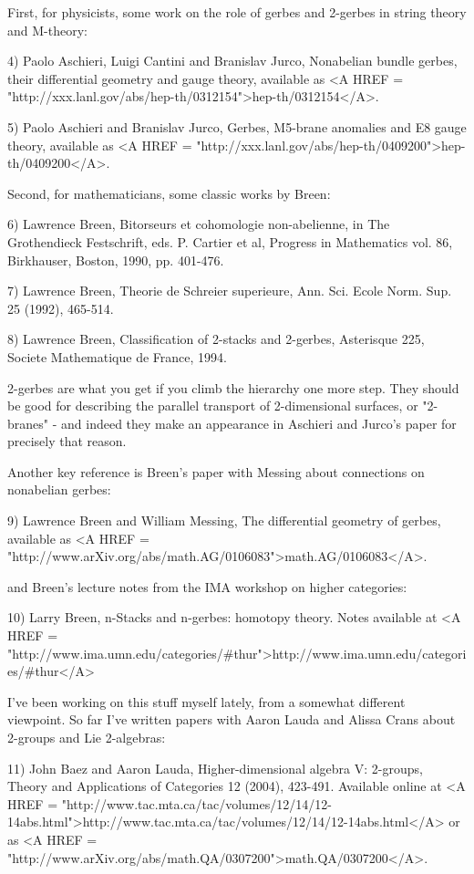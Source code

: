 First, for physicists, some work on the role of gerbes and 2-gerbes in 
string theory and M-theory:

4) Paolo Aschieri, Luigi Cantini and Branislav Jurco, Nonabelian bundle
gerbes, their differential geometry and gauge theory, available as 
<A HREF = "http://xxx.lanl.gov/abs/hep-th/0312154">hep-th/0312154</A>.

5) Paolo Aschieri and Branislav Jurco, Gerbes, M5-brane anomalies and
E8 gauge theory, available as <A HREF =
"http://xxx.lanl.gov/abs/hep-th/0409200">hep-th/0409200</A>.

Second, for mathematicians, some classic works by Breen:

6) Lawrence Breen, Bitorseurs et cohomologie non-abelienne,
in The Grothendieck Festschrift, eds. P. Cartier et al, Progress 
in Mathematics vol. 86, Birkhauser, Boston, 1990, pp. 401-476.

7) Lawrence Breen, Theorie de Schreier superieure, Ann. Sci. Ecole Norm.
Sup. 25 (1992), 465-514.

8) Lawrence Breen, Classification of 2-stacks and 2-gerbes, Asterisque
225, Societe Mathematique de France, 1994.

2-gerbes are what you get if you climb the hierarchy one more step.
They should be good for describing the parallel transport of 
2-dimensional surfaces, or "2-branes" - and indeed they make an 
appearance in Aschieri and Jurco's paper for precisely that reason.

Another key reference is Breen's paper with Messing about connections 
on nonabelian gerbes:

9) Lawrence Breen and William Messing, The differential geometry of gerbes,
available as <A HREF = "http://www.arXiv.org/abs/math.AG/0106083">math.AG/0106083</A>.

and Breen's lecture notes from the IMA workshop on higher categories:

10) Larry Breen, n-Stacks and n-gerbes: homotopy theory.
Notes available at <A HREF = "http://www.ima.umn.edu/categories/#thur">http://www.ima.umn.edu/categories/#thur</A>

I've been working on this stuff myself lately, from a somewhat different
viewpoint.  So far I've written papers with Aaron Lauda and Alissa Crans 
about 2-groups and Lie 2-algebras:

11) John Baez and Aaron Lauda, Higher-dimensional algebra V: 2-groups,
Theory and Applications of Categories 12 (2004), 423-491.  Available
online at <A HREF =
"http://www.tac.mta.ca/tac/volumes/12/14/12-14abs.html">http://www.tac.mta.ca/tac/volumes/12/14/12-14abs.html</A>
or as <A HREF =
"http://www.arXiv.org/abs/math.QA/0307200">math.QA/0307200</A>.

